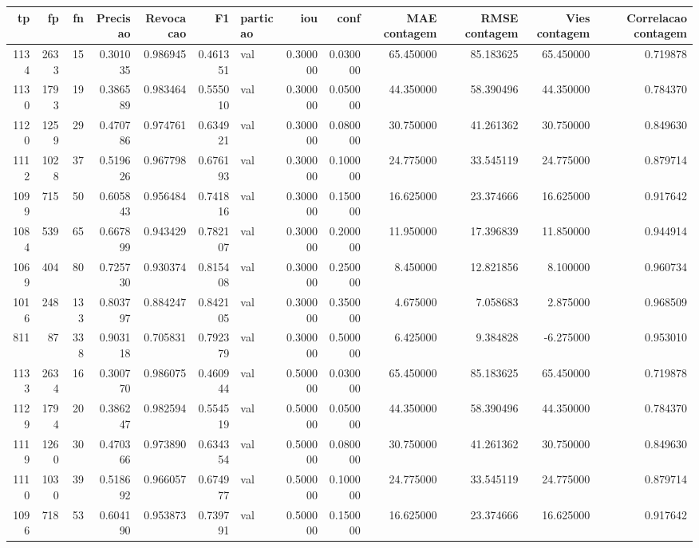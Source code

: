 \begin{tabular}{rrrrrrlrrrrrr}
\toprule
tp & fp & fn & Precisao & Revocacao & F1 & particao & iou & conf & MAE contagem & RMSE contagem & Vies contagem & Correlacao contagem \\
\midrule
1134 & 2633 & 15 & 0.301035 & 0.986945 & 0.461351 & val & 0.300000 & 0.030000 & 65.450000 & 85.183625 & 65.450000 & 0.719878 \\
1130 & 1793 & 19 & 0.386589 & 0.983464 & 0.555010 & val & 0.300000 & 0.050000 & 44.350000 & 58.390496 & 44.350000 & 0.784370 \\
1120 & 1259 & 29 & 0.470786 & 0.974761 & 0.634921 & val & 0.300000 & 0.080000 & 30.750000 & 41.261362 & 30.750000 & 0.849630 \\
1112 & 1028 & 37 & 0.519626 & 0.967798 & 0.676193 & val & 0.300000 & 0.100000 & 24.775000 & 33.545119 & 24.775000 & 0.879714 \\
1099 & 715 & 50 & 0.605843 & 0.956484 & 0.741816 & val & 0.300000 & 0.150000 & 16.625000 & 23.374666 & 16.625000 & 0.917642 \\
1084 & 539 & 65 & 0.667899 & 0.943429 & 0.782107 & val & 0.300000 & 0.200000 & 11.950000 & 17.396839 & 11.850000 & 0.944914 \\
1069 & 404 & 80 & 0.725730 & 0.930374 & 0.815408 & val & 0.300000 & 0.250000 & 8.450000 & 12.821856 & 8.100000 & 0.960734 \\
1016 & 248 & 133 & 0.803797 & 0.884247 & 0.842105 & val & 0.300000 & 0.350000 & 4.675000 & 7.058683 & 2.875000 & 0.968509 \\
811 & 87 & 338 & 0.903118 & 0.705831 & 0.792379 & val & 0.300000 & 0.500000 & 6.425000 & 9.384828 & -6.275000 & 0.953010 \\
1133 & 2634 & 16 & 0.300770 & 0.986075 & 0.460944 & val & 0.500000 & 0.030000 & 65.450000 & 85.183625 & 65.450000 & 0.719878 \\
1129 & 1794 & 20 & 0.386247 & 0.982594 & 0.554519 & val & 0.500000 & 0.050000 & 44.350000 & 58.390496 & 44.350000 & 0.784370 \\
1119 & 1260 & 30 & 0.470366 & 0.973890 & 0.634354 & val & 0.500000 & 0.080000 & 30.750000 & 41.261362 & 30.750000 & 0.849630 \\
1110 & 1030 & 39 & 0.518692 & 0.966057 & 0.674977 & val & 0.500000 & 0.100000 & 24.775000 & 33.545119 & 24.775000 & 0.879714 \\
1096 & 718 & 53 & 0.604190 & 0.953873 & 0.739791 & val & 0.500000 & 0.150000 & 16.625000 & 23.374666 & 16.625000 & 0.917642 \\

\end{tabular}
